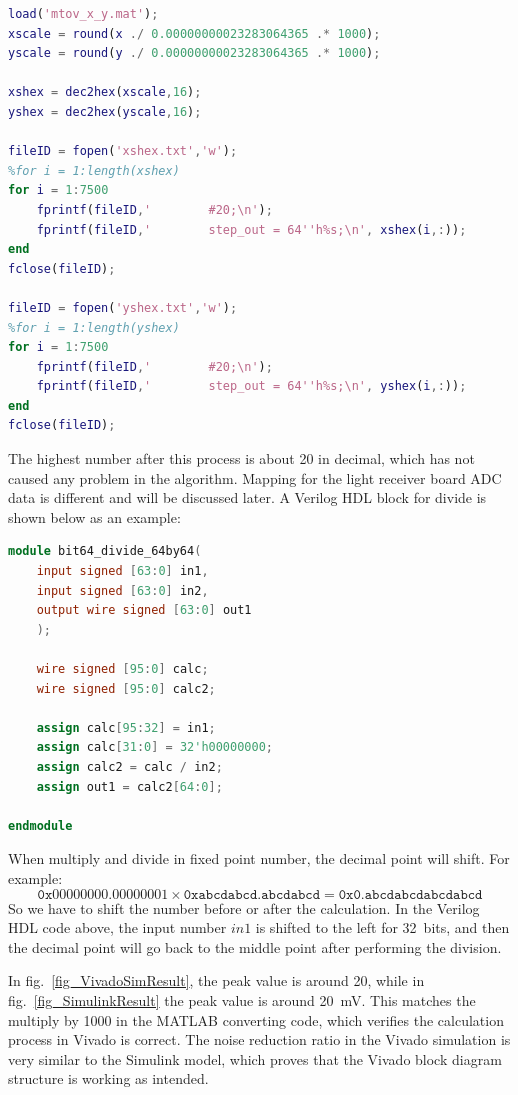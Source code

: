 \begin{lstlisting}[language=matlab]
load('mtov_x_y.mat');
xscale = round(x ./ 0.00000000023283064365 .* 1000);
yscale = round(y ./ 0.00000000023283064365 .* 1000);

xshex = dec2hex(xscale,16);
yshex = dec2hex(yscale,16);

fileID = fopen('xshex.txt','w');
%for i = 1:length(xshex)
for i = 1:7500
    fprintf(fileID,'        #20;\n');
    fprintf(fileID,'        step_out = 64''h%s;\n', xshex(i,:));
end
fclose(fileID);

fileID = fopen('yshex.txt','w');
%for i = 1:length(yshex)
for i = 1:7500
    fprintf(fileID,'        #20;\n');
    fprintf(fileID,'        step_out = 64''h%s;\n', yshex(i,:));
end
fclose(fileID);
\end{lstlisting}

The highest number after this process is about 20 in decimal, which has not caused any problem in the algorithm.  Mapping for the light receiver board ADC data is different and will be discussed later.  A Verilog HDL block for divide is shown below as an example:

\begin{lstlisting}[language=verilog]
module bit64_divide_64by64(
    input signed [63:0] in1,
    input signed [63:0] in2,
    output wire signed [63:0] out1
    );
    
    wire signed [95:0] calc;
    wire signed [95:0] calc2;
    
    assign calc[95:32] = in1;
    assign calc[31:0] = 32'h00000000;
    assign calc2 = calc / in2;
    assign out1 = calc2[64:0];
    
endmodule
\end{lstlisting}

When multiply and divide in fixed point number, the decimal point will shift.  For example:
$$\mathtt{0x00000000.00000001}\times\mathtt{0xabcdabcd.abcdabcd}=\mathtt{0x0.abcdabcdabcdabcd}$$
So we have to shift the number before or after the calculation.  In the Verilog HDL code above, the input number $in1$ is shifted to the left for \qty{32}{bits}, and then the decimal point will go back to the middle point after performing the division.

In fig.~\ref{fig_VivadoSimResult}, the peak value is around 20, while in fig.~\ref{fig_SimulinkResult} the peak value is around \qty{20}{mV}.  This matches the multiply by 1000 in the MATLAB converting code, which verifies the calculation process in Vivado is correct.  The noise reduction ratio in the Vivado simulation is very similar to the Simulink model, which proves that the Vivado block diagram structure is working as intended.

